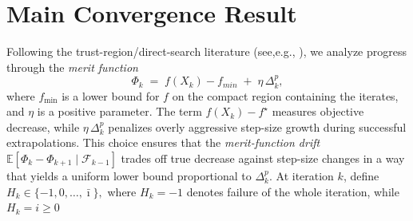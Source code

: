 \documentclass[11pt,a4paper]{article}
\newtheorem{lemma}{Lemma}[section]
\newcommand{\F}{\mathcal{F}}
\newcommand{\Imax}{\bar{\imath}}%
\newcommand{\Dexp}{p}
\newcommand{\EE}{\mathbb{E}}
\begin{document}
\section{Main Convergence Result} \label{sec:convergence}

Following the trust-region/direct-search literature (see,e.g., \cite{MR3506227,MR4758401}), we analyze progress through the \emph{merit function}
\begin{equation}\label{eq:phi-def}
  \Phi_k \;=\; f(X_k)-f_{min} \;+\; \eta\,\Delta_k^{\Dexp},
\end{equation}
where \(f_{\min}\) is a lower bound for \(f\) on the compact region containing the
iterates, and $\eta$ is a positive parameter. The term \(f(X_k)-f^\star\) measures objective decrease, while
\(\eta\,\Delta_k^{\Dexp}\) penalizes overly aggressive step-size growth during successful extrapolations. This choice ensures that the \emph{merit-function
drift}
\(\EE[\Phi_k-\Phi_{k+1}\mid\F_{k-1}]\) trades off true decrease against step-size changes in a way
that yields a uniform lower bound proportional to \(\Delta_k^{\Dexp}\).
At iteration \(k\), define
$H_k\in\{-1,0,\ldots,\Imax\},$ 
where \(H_k=-1\) denotes failure of the whole iteration, while \(H_k=i\ge0\)
\end{document}

